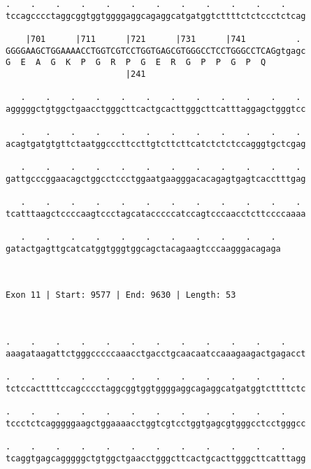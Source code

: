 \documentclass{article}
\begin{document}
\begin{Verbatim}
.    .    .    .    .    .    .    .    .    .    .    .    
tccagcccctaggcggtggtggggaggcagaggcatgatggtcttttctctccctctcag
                                                            
    |701      |711      |721      |731      |741          . 
GGGGAAGCTGGAAAACCTGGTCGTCCTGGTGAGCGTGGGCCTCCTGGGCCTCAGgtgagc
G  E  A  G  K  P  G  R  P  G  E  R  G  P  P  G  P  Q        
                        |241                                
  
   .    .    .    .    .    .    .    .    .    .    .    . 
agggggctgtggctgaacctgggcttcactgcacttgggcttcatttaggagctgggtcc
                                                            
   .    .    .    .    .    .    .    .    .    .    .    . 
acagtgatgtgttctaatggcccttccttgtcttcttcatctctctccagggtgctcgag
                                                            
   .    .    .    .    .    .    .    .    .    .    .    . 
gattgcccggaacagctggcctccctggaatgaagggacacagagtgagtcacctttgag
                                                            
   .    .    .    .    .    .    .    .    .    .    .    . 
tcatttaagctccccaagtccctagcatacccccatccagtcccaacctcttccccaaaa
                                                            
   .    .    .    .    .    .    .    .    .    .    . 
gatactgagttgcatcatggtgggtggcagctacagaagtcccaagggacagaga
                                                       
                                                       
 
Exon 11 | Start: 9577 | End: 9630 | Length: 53



.    .    .    .    .    .    .    .    .    .    .    .    
aaagataagattctgggcccccaaacctgacctgcaacaatccaaagaagactgagacct
                                                            
.    .    .    .    .    .    .    .    .    .    .    .    
tctccacttttccagcccctaggcggtggtggggaggcagaggcatgatggtcttttctc
                                                            
.    .    .    .    .    .    .    .    .    .    .    .    
tccctctcagggggaagctggaaaacctggtcgtcctggtgagcgtgggcctcctgggcc
                                                            
.    .    .    .    .    .    .    .    .    .    .    .    
tcaggtgagcagggggctgtggctgaacctgggcttcactgcacttgggcttcatttagg
                                                            

\end{Verbatim}
\end{document}
